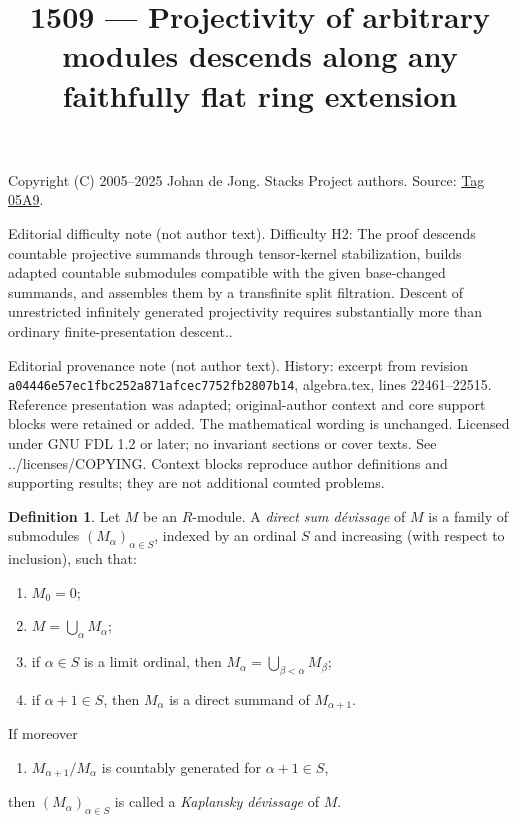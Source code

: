 \documentclass{amsart}
\theoremstyle{plain}
\theoremstyle{definition}
\newtheorem{definition}[subsection]{Definition}
\theoremstyle{remark}
\numberwithin{equation}{subsection}
\begin{document}
\title[Stacks Project, Tag 05A9]{1509 --- Projectivity of arbitrary modules descends along any faithfully flat ring extension}
\maketitle
\noindent Copyright (C) 2005--2025 Johan de Jong. Stacks Project authors. Source: \href{https://stacks.math.columbia.edu/tag/05A9}{Tag 05A9}.

\noindent Editorial difficulty note (not author text). Difficulty H2: The proof descends countable projective summands through tensor-kernel stabilization, builds adapted countable submodules compatible with the given base-changed summands, and assembles them by a transfinite split filtration. Descent of unrestricted infinitely generated projectivity requires substantially more than ordinary finite-presentation descent..

\noindent Editorial provenance note (not author text). History: excerpt from revision \texttt{a0444\allowbreak 6e57e\allowbreak c1fbc\allowbreak 252a8\allowbreak 71afc\allowbreak ec775\allowbreak 2fb28\allowbreak 07b14}, algebra.tex, lines 22461--22515. Reference presentation was adapted; original-author context and core support blocks were retained or added. The mathematical wording is unchanged. Licensed under GNU FDL 1.2 or later; no invariant sections or cover texts. See ../licenses/COPYING. Context blocks reproduce author definitions and supporting results; they are not additional counted problems.

\begin{definition}
\label{definition-devissage}
Let $M$ be an $R$-module.  A {\it direct sum d\'evissage} of $M$ is a family
of submodules $(M_{\alpha})_{\alpha \in S}$, indexed by an ordinal $S$ and
increasing (with respect to inclusion), such that:
\begin{enumerate}
\item[(0)] $M_0 = 0$;
\item[(1)] $M = \bigcup_{\alpha} M_{\alpha}$;
\item[(2)] if $\alpha \in S$ is a limit ordinal, then $M_{\alpha} =
\bigcup_{\beta < \alpha} M_{\beta}$;
\item[(3)] if $\alpha + 1 \in S$, then $M_{\alpha}$ is a direct summand of
$M_{\alpha + 1}$.
\end{enumerate}
If moreover
\begin{enumerate}
\item[(4)] $M_{\alpha + 1}/M_{\alpha}$ is countably generated for
$\alpha + 1 \in S$,
\end{enumerate}
then $(M_{\alpha})_{\alpha \in S}$ is called a {\it Kaplansky d\'evissage}
of $M$.
\end{definition}
\end{document}
